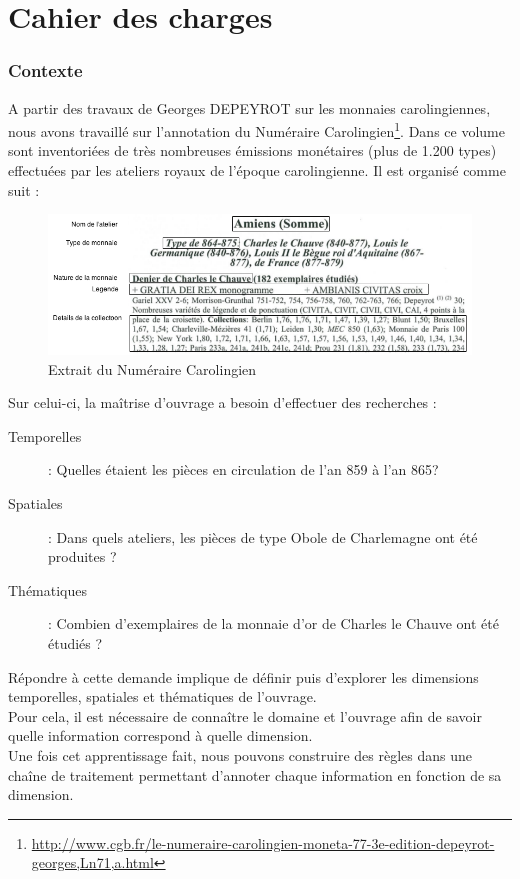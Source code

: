 \documentclass[a4paper, 11pt]{report}
\begin{document}
\part{Cahier des charges}
    \section{Contexte}

A partir des travaux de Georges DEPEYROT sur les monnaies carolingiennes, nous avons travaillé sur l'annotation du Numéraire Carolingien\footnote{\url{http://www.cgb.fr/le-numeraire-carolingien-moneta-77-3e-edition-depeyrot-georges,Ln71,a.html}}. Dans ce volume sont inventoriées de très nombreuses émissions monétaires (plus de 1.200 types) effectuées par les ateliers royaux de l'époque carolingienne. Il est organisé comme suit :
\begin{figure}[H]
\centering
\includegraphics[scale=.5]{img/depeyrotExemple.png}
\caption{Extrait du Numéraire Carolingien}
\end{figure}


Sur celui-ci, la maîtrise d'ouvrage a besoin d'effectuer des recherches :

\begin{description}
\item [Temporelles] : Quelles étaient les pièces en circulation de l'an 859 à l'an 865?
\item [Spatiales] : Dans quels ateliers, les pièces de type Obole de Charlemagne ont été produites ? 
\item [Thématiques] : Combien d'exemplaires de la monnaie d'or de Charles le Chauve ont été étudiés ?
\end{description}

Répondre à cette demande implique de définir puis d'explorer les dimensions temporelles, spatiales et thématiques de l'ouvrage.\\
Pour cela, il est nécessaire de connaître le domaine et l'ouvrage afin de savoir quelle information correspond à quelle dimension.\\
Une fois cet apprentissage fait, nous pouvons construire des règles dans une chaîne de traitement permettant d'annoter chaque information en fonction de sa dimension. \\
\end{document}
